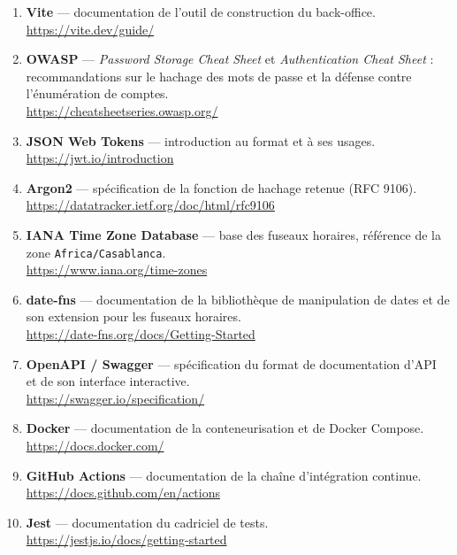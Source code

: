 \begin{enumerate}[leftmargin=1.1cm,itemsep=6pt]
  \item \textbf{Vite} --- documentation de l'outil de construction du
  back-office.
  \\ \url{https://vite.dev/guide/}

  \item \textbf{OWASP} --- \textit{Password Storage Cheat Sheet} et
  \textit{Authentication Cheat Sheet} : recommandations sur le hachage des mots
  de passe et la défense contre l'énumération de comptes.
  \\ \url{https://cheatsheetseries.owasp.org/}

  \item \textbf{JSON Web Tokens} --- introduction au format et à ses usages.
  \\ \url{https://jwt.io/introduction}

  \item \textbf{Argon2} --- spécification de la fonction de hachage retenue
  (RFC 9106).
  \\ \url{https://datatracker.ietf.org/doc/html/rfc9106}

  \item \textbf{IANA Time Zone Database} --- base des fuseaux horaires,
  référence de la zone \texttt{Africa/Casablanca}.
  \\ \url{https://www.iana.org/time-zones}

  \item \textbf{date-fns} --- documentation de la bibliothèque de manipulation
  de dates et de son extension pour les fuseaux horaires.
  \\ \url{https://date-fns.org/docs/Getting-Started}

  \item \textbf{OpenAPI / Swagger} --- spécification du format de documentation
  d'API et de son interface interactive.
  \\ \url{https://swagger.io/specification/}

  \item \textbf{Docker} --- documentation de la conteneurisation et de Docker
  Compose.
  \\ \url{https://docs.docker.com/}

  \item \textbf{GitHub Actions} --- documentation de la chaîne d'intégration
  continue.
  \\ \url{https://docs.github.com/en/actions}

  \item \textbf{Jest} --- documentation du cadriciel de tests.
  \\ \url{https://jestjs.io/docs/getting-started}


\end{enumerate}
